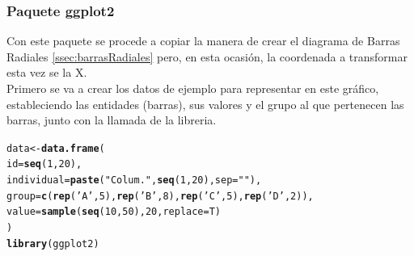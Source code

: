 \documentclass{article}\usepackage[]{graphicx}\usepackage[]{color}
\makeatletter
\newcommand{\hlnum}[1]{\textcolor[rgb]{0.686,0.059,0.569}{#1}}%
\newcommand{\hlstr}[1]{\textcolor[rgb]{0.192,0.494,0.8}{#1}}%
\newcommand{\hlstd}[1]{\textcolor[rgb]{0.345,0.345,0.345}{#1}}%
\newcommand{\hlkwb}[1]{\textcolor[rgb]{0.69,0.353,0.396}{#1}}%
\newcommand{\hlkwc}[1]{\textcolor[rgb]{0.333,0.667,0.333}{#1}}%
\newcommand{\hlkwd}[1]{\textcolor[rgb]{0.737,0.353,0.396}{\textbf{#1}}}%
\newenvironment{kframe}{%
 \def\at@end@of@kframe{}%
 \ifinner\ifhmode%
  \def\at@end@of@kframe{\end{minipage}}%
  \begin{minipage}{\columnwidth}%
 \fi\fi%
 \def\FrameCommand##1{\hskip\@totalleftmargin \hskip-\fboxsep
 \colorbox{shadecolor}{##1}\hskip-\fboxsep
     \hskip-\linewidth \hskip-\@totalleftmargin \hskip\columnwidth}%
 \MakeFramed {\advance\hsize-\width
   \@totalleftmargin\z@ \linewidth\hsize
   \@setminipage}}%
 {\par\unskip\endMakeFramed%
 \at@end@of@kframe}
\newenvironment{knitrout}{}{} %
\makeatother
\begin{document}
\subsubsection{Paquete ggplot2}
Con este paquete \cite{docu_ggplot2}
se procede a copiar la manera de crear el diagrama de Barras Radiales \autoref{ssec:barrasRadiales}
 pero, en esta ocasi\'on, la coordenada a transformar esta vez se la X.~\\
Primero se va a crear los datos de ejemplo para representar en este gr\'afico, estableciendo las entidades (barras), sus valores y el grupo al que pertenecen las barras, junto con la llamada de la libreria.
\begin{knitrout}
\color{fgcolor}\begin{kframe}
\begin{alltt}
\hlstd{data} \hlkwb{<-} \hlkwd{data.frame}\hlstd{(}
  \hlkwc{id}\hlstd{=}\hlkwd{seq}\hlstd{(}\hlnum{1}\hlstd{,}\hlnum{20}\hlstd{),}
  \hlkwc{individual}\hlstd{=}\hlkwd{paste}\hlstd{(} \hlstr{"Colum. "}\hlstd{,} \hlkwd{seq}\hlstd{(}\hlnum{1}\hlstd{,}\hlnum{20}\hlstd{),} \hlkwc{sep}\hlstd{=}\hlstr{""}\hlstd{),}
  \hlkwc{group}\hlstd{=}\hlkwd{c}\hlstd{(} \hlkwd{rep}\hlstd{(}\hlstr{'A'}\hlstd{,} \hlnum{5}\hlstd{),} \hlkwd{rep}\hlstd{(}\hlstr{'B'}\hlstd{,} \hlnum{8}\hlstd{),} \hlkwd{rep}\hlstd{(}\hlstr{'C'}\hlstd{,} \hlnum{5}\hlstd{),} \hlkwd{rep}\hlstd{(}\hlstr{'D'}\hlstd{,} \hlnum{2}\hlstd{)) ,}
  \hlkwc{value}\hlstd{=}\hlkwd{sample}\hlstd{(} \hlkwd{seq}\hlstd{(}\hlnum{10}\hlstd{,}\hlnum{50}\hlstd{),} \hlnum{20}\hlstd{,} \hlkwc{replace}\hlstd{=T)}
\hlstd{)}
\hlkwd{library}\hlstd{(ggplot2)}
\end{alltt}
\end{kframe}
\end{knitrout}
\end{document}
